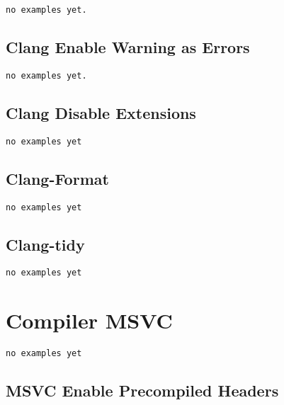 \begin{verbatim}
no examples yet.
\end{verbatim}

\subsection{Clang Enable Warning as Errors}

\begin{verbatim}
no examples yet.
\end{verbatim}

\subsection{Clang Disable Extensions}

\begin{verbatim}
no examples yet
\end{verbatim}

\subsection{Clang-Format}

\begin{verbatim}
no examples yet
\end{verbatim}

\subsection{Clang-tidy}

\begin{verbatim}
no examples yet
\end{verbatim}


\section{Compiler MSVC}

\begin{verbatim}
no examples yet
\end{verbatim}

\subsection{MSVC Enable Precompiled Headers}

